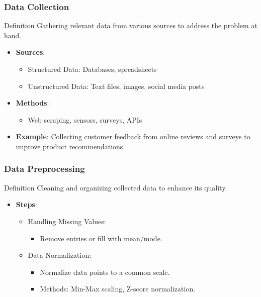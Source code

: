 \documentclass[aspectratio=169]{beamer}
\begin{document}
\begin{frame}[fragile]
    \frametitle{Data Collection}
    \begin{block}{Definition}
        Gathering relevant data from various sources to address the problem at hand.
    \end{block}
    \begin{itemize}
        \item \textbf{Sources}:
        \begin{itemize}
            \item Structured Data: Databases, spreadsheets
            \item Unstructured Data: Text files, images, social media posts
        \end{itemize}
        \item \textbf{Methods}:
        \begin{itemize}
            \item Web scraping, sensors, surveys, APIs
        \end{itemize}
        \item \textbf{Example}: Collecting customer feedback from online reviews and surveys to improve product recommendations.
    \end{itemize}
\end{frame}

\begin{frame}[fragile]
    \frametitle{Data Preprocessing}
    \begin{block}{Definition}
        Cleaning and organizing collected data to enhance its quality.
    \end{block}
    \begin{itemize}
        \item \textbf{Steps}:
        \begin{itemize}
            \item Handling Missing Values:
            \begin{itemize}
                \item Remove entries or fill with mean/mode.
            \end{itemize}
            \item Data Normalization:
            \begin{itemize}
                \item Normalize data points to a common scale.
                \item Methods: Min-Max scaling, Z-score normalization.
            \end{itemize}
        \end{itemize}
    \end{itemize}
\end{frame}
\end{document}
